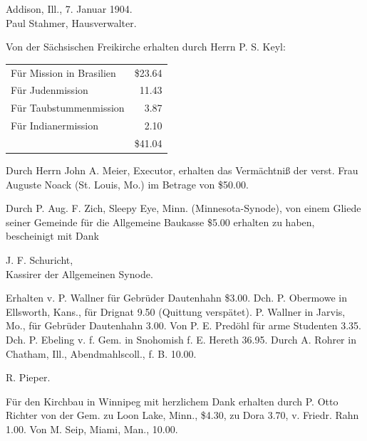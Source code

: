 \begin{unterschrift}
Addison, Ill., 7. Januar 1904.\\
Paul Stahmer, Hausverwalter.
\end{unterschrift}

\trenner

Von der Sächsischen Freikirche erhalten durch Herrn P. S. Keyl:

\begin{center}
\begin{tabular}{lr}
Für Mission in Brasilien & \$23.64\\
Für Judenmission & 11.43\\
Für Taubstummenmission & 3.87\\
Für Indianermission & 2.10\\
\hline
 & \$41.04
\end{tabular}
\end{center}

\trenner

Durch Herrn John A. Meier, Executor, erhalten das Vermächtniß der verst. Frau Auguste Noack (St. Louis, Mo.) im Betrage von \$50.00.

\trenner

Durch P. Aug. F. Zich, Sleepy Eye, Minn. (Minnesota-Synode), von einem Gliede seiner Gemeinde für die Allgemeine Baukasse \$5.00 erhalten zu haben, bescheinigt mit Dank

\begin{unterschrift}
J. F. Schuricht,\\
Kassirer der Allgemeinen Synode.
\end{unterschrift}

\trenner

Erhalten v. P. Wallner für Gebrüder Dautenhahn \$3.00. Dch. P. Obermowe in Ellsworth, Kans., für Drignat 9.50 (Quittung verspätet). P. Wallner in Jarvis, Mo., für Gebrüder Dautenhahn 3.00. Von P. E. Predöhl für arme Studenten 3.35. Dch. P. Ebeling v. f. Gem. in Snohomish f. E. Hereth 36.95. Durch A. Rohrer in Chatham, Ill., Abendmahlscoll., f. B. 10.00.

\begin{unterschrift}
R. Pieper.
\end{unterschrift}

\trenner

Für den Kirchbau in Winnipeg mit herzlichem Dank erhalten durch P. Otto Richter von der Gem. zu Loon Lake, Minn., \$4.30, zu Dora 3.70, v. Friedr. Rahn 1.00. Von M. Seip, Miami, Man., 10.00.

